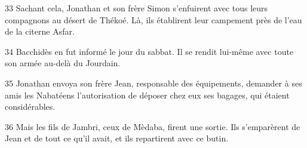 
33 Sachant cela, Jonathan et son frère Simon s’enfuirent avec tous leurs compagnons au désert de Thékoé. Là, ils établirent leur campement près de l’eau de la citerne Asfar.

34 Bacchidès en fut informé le jour du sabbat. Il se rendit lui-même avec toute son armée au-delà du Jourdain.

35 Jonathan envoya son frère Jean, responsable des équipements, demander à ses amis les Nabatéens l’autorisation de déposer chez eux ses bagages, qui étaient considérables.

36 Mais les fils de Jambri, ceux de Mèdaba, firent une sortie. Ils s’emparèrent de Jean et de tout ce qu’il avait, et ils repartirent avec ce butin.
